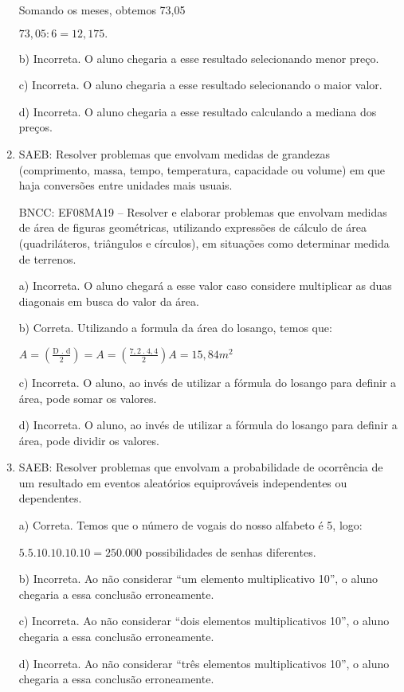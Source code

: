 \begin{enumerate}
Somando os meses, obtemos 73,05

$73,05 : 6 = 12,175.$

b) Incorreta. O aluno chegaria a esse resultado selecionando menor
preço.

c) Incorreta. O aluno chegaria a esse resultado selecionando o
maior valor.

d) Incorreta. O aluno chegaria a esse resultado calculando a
mediana dos preços.

\item SAEB: Resolver problemas que envolvam medidas de grandezas (comprimento,
massa, tempo, temperatura, capacidade ou volume) em que haja conversões
entre unidades mais usuais.

BNCC: EF08MA19 -- Resolver e elaborar problemas que envolvam medidas de
área de figuras geométricas, utilizando expressões de cálculo de área
(quadriláteros, triângulos e círculos), em situações como determinar
medida de terrenos.

a) Incorreta. O aluno chegará a esse valor caso considere
multiplicar as duas diagonais em busca do valor da área.

b) Correta. Utilizando a formula da área do losango, temos que:

$A=(\frac{\text{D\ .\ d}}{2})=

A= (\frac{7,2\ .\ 4,4}{2})

A= 15,84 m^2$

c) Incorreta. O aluno, ao invés de utilizar a fórmula do losango
para definir a área, pode somar os valores.

d) Incorreta. O aluno, ao invés de utilizar a fórmula do losango
para definir a área, pode dividir os valores.

\item SAEB: Resolver problemas que envolvam a probabilidade de ocorrência de
um resultado em eventos aleatórios equiprováveis independentes ou
dependentes.

a) Correta. Temos que o número de vogais do nosso alfabeto é 5,
logo:

$5 . 5 . 10 . 10 . 10 . 10 = 250.000$ possibilidades de senhas diferentes.

b) Incorreta. Ao não considerar ``um elemento multiplicativo 10'',
o aluno chegaria a essa conclusão erroneamente.

c) Incorreta. Ao não considerar ``dois elementos multiplicativos
10'', o aluno chegaria a essa conclusão erroneamente.

d) Incorreta. Ao não considerar ``três elementos multiplicativos
10'', o aluno chegaria a essa conclusão erroneamente.


\end{enumerate}
